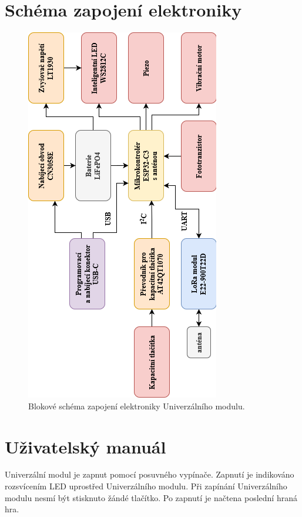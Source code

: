 \chapter{Schéma zapojení elektroniky}

\begin{figure}[!h]
	\begin{center}
	  \includegraphics[scale=1.2]{obrazky/blokove_schema_finalni_verze_priloha.png}
	\end{center}
	\caption[Blokové schéma zapojení elektroniky Univerzálního modulu]{Blokové schéma zapojení elektroniky Univerzálního modulu.}
\end{figure}





\chapter{Uživatelský manuál}
Univerzální modul je zapnut pomocí posuvného vypínače. Zapnutí je indikováno rozsvícením LED uprostřed Univerzálního modulu. Při zapínání Univerzálního modulu nesmí být stisknuto žándé tlačítko. Po zapnutí je načtena 
poslední hraná hra. 

